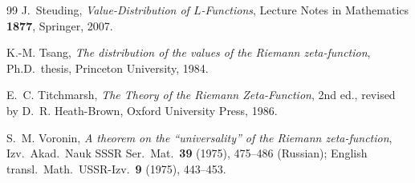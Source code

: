 \documentclass[11pt]{amsart}
\theoremstyle{plain}
\theoremstyle{definition}
\theoremstyle{remark}
\begin{document}
\begin{thebibliography}{99}
J.~Steuding, \emph{Value-Distribution of $L$-Functions}, Lecture Notes in Mathematics \textbf{1877}, Springer, 2007.

K.-M. Tsang, \emph{The distribution of the values of the Riemann zeta-function}, Ph.D.\ thesis, Princeton University, 1984.

E.~C. Titchmarsh, \emph{The Theory of the Riemann Zeta-Function}, 2nd ed., revised by D.~R. Heath-Brown, Oxford University Press, 1986.

S.~M. Voronin, \emph{A theorem on the ``universality'' of the Riemann zeta-function}, Izv.\ Akad.\ Nauk SSSR Ser.\ Mat.\ \textbf{39} (1975), 475--486 (Russian); English transl.\ Math.\ USSR-Izv.\ \textbf{9} (1975), 443--453.

\end{thebibliography}
\end{document}
